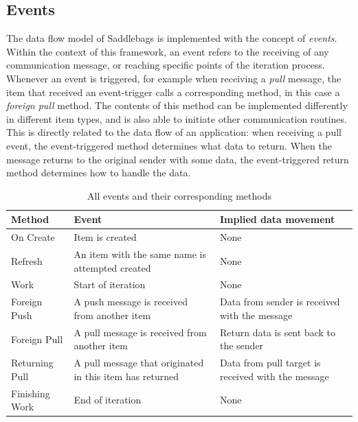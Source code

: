 \documentclass{uit-report}
\begin{document}
\subsection{Events} \label{section:events}
The data flow model of Saddlebags is implemented with the concept of \emph{events}. Within the context of this framework, an event refers to the receiving of any communication message, or reaching specific points of the iteration process. Whenever an event is triggered, for example when receiving a \emph{pull} message, the item that received an event-trigger calls a corresponding method, in this case a \emph{foreign pull} method. The contents of this method can be implemented differently in different item types, and is also able to initiate other communication routines. This is directly related to the data flow of an application: when receiving a pull event, the event-triggered method determines what data to return. When the message returns to the original sender with some data, the event-triggered return method determines how to handle the data. 
\newpage

\begin{table}[h]
\setlength\arrayrulewidth{1pt}
\renewcommand{\arraystretch}{2}
\begin{tabular}{ | p{3cm} | p{6cm} | p{6cm} |}
   	\hline
   	\textbf{Method} & \textbf{Event} & \textbf{Implied data movement} \\ \hline
   	On Create & Item is created & None\\ \hline
  	Refresh & An item with the same name is attempted created & None \\ \hline
  	Work & Start of iteration & None \\ \hline
   	Foreign Push & A push message is received from another item & Data from sender is received with the message  \\ \hline
   	Foreign Pull & A pull message is received from another item & Return data is sent back to the sender\\ \hline
	Returning Pull & A pull message that originated in this item has returned & Data from pull target is received with the message\\ \hline
	Finishing Work & End of iteration & None\\ \hline

\end{tabular}
\caption{All events and their corresponding methods}
\label{table:events}
\end{table}
\vspace{1.5cm}
\end{document}
